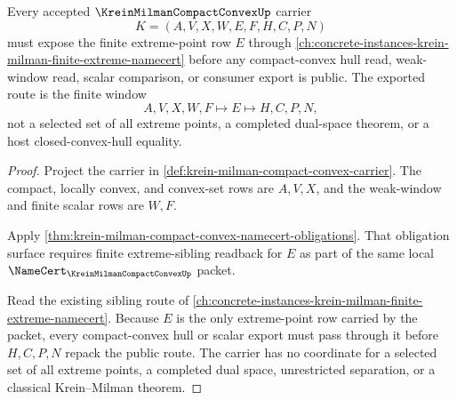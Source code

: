 \begin{theorem}
\label{thm:krein-milman-compact-convex-extreme-window-handoff}
Every accepted $\KreinMilmanCompactConvexUp$ carrier
$$
K=(A,V,X,W,E,F,H,C,P,N)
$$
must expose the finite extreme-point row $E$ through \autoref{ch:concrete-instances-krein-milman-finite-extreme-namecert} before any compact-convex hull read, weak-window read, scalar comparison, or consumer export is public. The exported route is the finite window
$$
A,V,X,W,F \longmapsto E \longmapsto H,C,P,N,
$$
not a selected set of all extreme points, a completed dual-space theorem, or a host closed-convex-hull equality.
\end{theorem}
\begin{proof}
Project the carrier in \autoref{def:krein-milman-compact-convex-carrier}. The compact, locally convex, and convex-set rows are $A,V,X$, and the weak-window and finite scalar rows are $W,F$.

Apply \autoref{thm:krein-milman-compact-convex-namecert-obligations}. That obligation surface requires finite extreme-sibling readback for $E$ as part of the same local $\NameCert_{\KreinMilmanCompactConvexUp}$ packet.

Read the existing sibling route of \autoref{ch:concrete-instances-krein-milman-finite-extreme-namecert}. Because $E$ is the only extreme-point row carried by the packet, every compact-convex hull or scalar export must pass through it before $H,C,P,N$ repack the public route. The carrier has no coordinate for a selected set of all extreme points, a completed dual space, unrestricted separation, or a classical Krein--Milman theorem.
\end{proof}


\begin{closurestatus}{\KreinMilmanCompactConvexUp}
  \theoryclosure{\seedClosure}
  \formalstatus{\unformalizedV}
\end{closurestatus}
